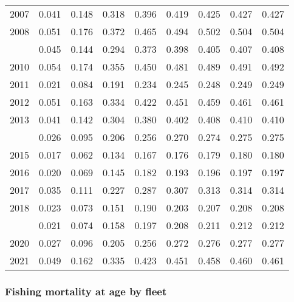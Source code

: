 \documentclass[
]{article}
\begin{document}
\begin{longtable}[t]{lrrrrrrrr}
2007 & 0.041 & 0.148 & 0.318 & 0.396 & 0.419 & 0.425 & 0.427 & 0.427\\
2008 & 0.051 & 0.176 & 0.372 & 0.465 & 0.494 & 0.502 & 0.504 & 0.504\\
\addlinespace
2009 & 0.045 & 0.144 & 0.294 & 0.373 & 0.398 & 0.405 & 0.407 & 0.408\\
2010 & 0.054 & 0.174 & 0.355 & 0.450 & 0.481 & 0.489 & 0.491 & 0.492\\
2011 & 0.021 & 0.084 & 0.191 & 0.234 & 0.245 & 0.248 & 0.249 & 0.249\\
2012 & 0.051 & 0.163 & 0.334 & 0.422 & 0.451 & 0.459 & 0.461 & 0.461\\
2013 & 0.041 & 0.142 & 0.304 & 0.380 & 0.402 & 0.408 & 0.410 & 0.410\\
\addlinespace
2014 & 0.026 & 0.095 & 0.206 & 0.256 & 0.270 & 0.274 & 0.275 & 0.275\\
2015 & 0.017 & 0.062 & 0.134 & 0.167 & 0.176 & 0.179 & 0.180 & 0.180\\
2016 & 0.020 & 0.069 & 0.145 & 0.182 & 0.193 & 0.196 & 0.197 & 0.197\\
2017 & 0.035 & 0.111 & 0.227 & 0.287 & 0.307 & 0.313 & 0.314 & 0.314\\
2018 & 0.023 & 0.073 & 0.151 & 0.190 & 0.203 & 0.207 & 0.208 & 0.208\\
\addlinespace
2019 & 0.021 & 0.074 & 0.158 & 0.197 & 0.208 & 0.211 & 0.212 & 0.212\\
2020 & 0.027 & 0.096 & 0.205 & 0.256 & 0.272 & 0.276 & 0.277 & 0.277\\
2021 & 0.049 & 0.162 & 0.335 & 0.423 & 0.451 & 0.458 & 0.460 & 0.461\\*
\end{longtable}

\hypertarget{fishing-mortality-at-age-by-fleet}{%
\subsubsection{Fishing mortality at age by
fleet}\label{fishing-mortality-at-age-by-fleet}}
\end{document}
